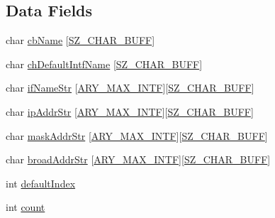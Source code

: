 \subsection*{Data Fields}
\begin{DoxyCompactItemize}
\item 
char \hyperlink{struct__ip_broadcast_array_a0f592bd31dcc3ce00a349f04ff6bd1ba}{cb\+Name} \mbox{[}\hyperlink{skn__common__headers_8h_a8d2978ad614b0de81c60483e706d9306}{S\+Z\+\_\+\+C\+H\+A\+R\+\_\+\+B\+U\+FF}\mbox{]}
\item 
char \hyperlink{struct__ip_broadcast_array_a06dab8742df19b5aec8538842617778d}{ch\+Default\+Intf\+Name} \mbox{[}\hyperlink{skn__common__headers_8h_a8d2978ad614b0de81c60483e706d9306}{S\+Z\+\_\+\+C\+H\+A\+R\+\_\+\+B\+U\+FF}\mbox{]}
\item 
char \hyperlink{struct__ip_broadcast_array_a193b90f271c061e8bf1593bab6a182c9}{if\+Name\+Str} \mbox{[}\hyperlink{skn__common__headers_8h_a00b19837422a3b13d82b9a525e92ef51}{A\+R\+Y\+\_\+\+M\+A\+X\+\_\+\+I\+N\+TF}\mbox{]}\mbox{[}\hyperlink{skn__common__headers_8h_a8d2978ad614b0de81c60483e706d9306}{S\+Z\+\_\+\+C\+H\+A\+R\+\_\+\+B\+U\+FF}\mbox{]}
\item 
char \hyperlink{struct__ip_broadcast_array_a96891ccc707337890b2a166e3ef3a8e1}{ip\+Addr\+Str} \mbox{[}\hyperlink{skn__common__headers_8h_a00b19837422a3b13d82b9a525e92ef51}{A\+R\+Y\+\_\+\+M\+A\+X\+\_\+\+I\+N\+TF}\mbox{]}\mbox{[}\hyperlink{skn__common__headers_8h_a8d2978ad614b0de81c60483e706d9306}{S\+Z\+\_\+\+C\+H\+A\+R\+\_\+\+B\+U\+FF}\mbox{]}
\item 
char \hyperlink{struct__ip_broadcast_array_a9241c1fbfb22a3ecfe4777863a063eb3}{mask\+Addr\+Str} \mbox{[}\hyperlink{skn__common__headers_8h_a00b19837422a3b13d82b9a525e92ef51}{A\+R\+Y\+\_\+\+M\+A\+X\+\_\+\+I\+N\+TF}\mbox{]}\mbox{[}\hyperlink{skn__common__headers_8h_a8d2978ad614b0de81c60483e706d9306}{S\+Z\+\_\+\+C\+H\+A\+R\+\_\+\+B\+U\+FF}\mbox{]}
\item 
char \hyperlink{struct__ip_broadcast_array_af40943e174ba847fa0218cfa6051e277}{broad\+Addr\+Str} \mbox{[}\hyperlink{skn__common__headers_8h_a00b19837422a3b13d82b9a525e92ef51}{A\+R\+Y\+\_\+\+M\+A\+X\+\_\+\+I\+N\+TF}\mbox{]}\mbox{[}\hyperlink{skn__common__headers_8h_a8d2978ad614b0de81c60483e706d9306}{S\+Z\+\_\+\+C\+H\+A\+R\+\_\+\+B\+U\+FF}\mbox{]}
\item 
int \hyperlink{struct__ip_broadcast_array_a5822ff77ae9f31bd3b4298d463c02f1f}{default\+Index}
\item 
int \hyperlink{struct__ip_broadcast_array_a971377a4c995292b8bd908f185cfc844}{count}
\end{DoxyCompactItemize}


